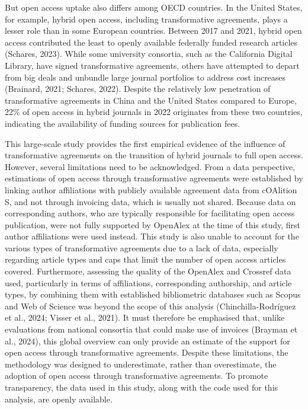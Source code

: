 \documentclass[a4paper,man,floatsintext,longtable,noextraspace,12pt]{apa6}
\begin{document}
But open access uptake also differs among OECD countries. In the United
States, for example, hybrid open access, including transformative
agreements, plays a lesser role than in some European countries. Between
2017 and 2021, hybrid open access contributed the least to openly
available federally funded research articles (Schares, 2023). While some
university consortia, such as the California Digital Library, have
signed transformative agreements, others have attempted to depart from
big deals and unbundle large journal portfolios to address cost
increases (Brainard, 2021; Schares, 2022). Despite the relatively low
penetration of transformative agreements in China and the United States
compared to Europe, 22\% of open access in hybrid journals in 2022
originates from these two countries, indicating the availability of
funding sources for publication fees.

This large-scale study provides the first empirical evidence of the
influence of transformative agreements on the transition of hybrid
journals to full open access. However, several limitations need to be
acknowledged. From a data perspective, estimations of open access
through transformative agreements were established by linking author
affiliations with publicly available agreement data from cOAlition S,
and not through invoicing data, which is usually not shared. Because
data on corresponding authors, who are typically responsible for
facilitating open access publication, were not fully supported by
OpenAlex at the time of this study, first author affiliations were used
instead. This study is also unable to account for the various types of
transformative agreements due to a lack of data, especially regarding
article types and caps that limit the number of open access articles
covered. Furthermore, assessing the quality of the OpenAlex and Crossref
data used, particularly in terms of affiliations, corresponding
authorship, and article types, by combining them with established
bibliometric databases such as Scopus and Web of Science was beyond the
scope of this analysis (Chinchilla-Rodríguez et al., 2024; Visser et
al., 2021). It must therefore be emphasised that, unlike evaluations
from national consortia that could make use of invoices (Brayman et al.,
2024), this global overview can only provide an estimate of the support
for open access through transformative agreements. Despite these
limitations, the methodology was designed to underestimate, rather than
overestimate, the adoption of open access through transformative
agreements. To promote transparency, the data used in this study, along
with the code used for this analysis, are openly available.
\end{document}
